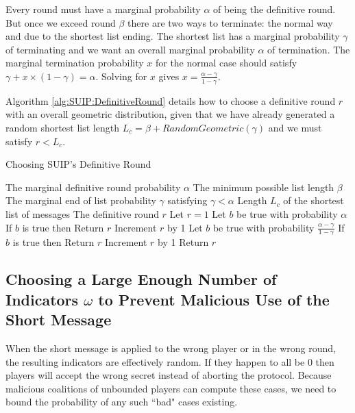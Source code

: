 \documentclass{dalcsthesis}
\begin{document}
Every round must have a marginal probability $\alpha$ of being the definitive round. But once we exceed round $\beta$ there are two ways to terminate: the normal way and due to the shortest list ending. The shortest list has a marginal probability $\gamma$ of terminating and we want an overall marginal probability $\alpha$ of termination. The marginal termination probability $x$ for the normal case should satisfy $\gamma + x \times (1 - \gamma) = \alpha$. Solving for $x$ gives $x = \frac{\alpha - \gamma}{1 - \gamma}$.

Algorithm \ref{alg:SUIP:DefinitiveRound} details how to choose a definitive round $r$ with an overall geometric distribution, given that we have already generated a random shortest list length $L_c = \beta + RandomGeometric(\gamma)$ and we must satisfy $r < L_c$.

\begin{algorithm}
  \caption{Choosing SUIP's Definitive Round}
  \label{alg:SUIP:DefinitiveRound}
  \begin{algorithmic}
    \INPUT The marginal definitive round probability $\alpha$ 
    \INPUT The minimum possible list length $\beta$
    \INPUT The marginal end of list probability $\gamma$ satisfying $\gamma < \alpha$
    \INPUT Length $L_c$ of the shortest list of messages
    \OUTPUT The definitive round $r$
    \STATE Let $r = 1$
      \STATE Let $b$ be true with probability $\alpha$
      \STATE If $b$ is true then Return $r$
      \STATE Increment $r$ by 1 
    \ENDWHILE
      \STATE Let $b$ be true with probability $\frac{\alpha - \gamma}{1 - \gamma}$
      \STATE If $b$ is true then Return $r$
      \STATE Increment $r$ by 1
    \ENDWHILE
    \STATE Return $r$
  \end{algorithmic}
\end{algorithm}

\subsection{Choosing a Large Enough Number of Indicators $\omega$ to Prevent Malicious Use of the Short Message}
\label{Sec:SUIP:MinIndicators}

When the short message is applied to the wrong player or in the wrong round, the resulting indicators are effectively random. If they happen to all be 0 then players will accept the wrong secret instead of aborting the protocol. Because malicious coalitions of unbounded players can compute these cases, we need to bound the probability of any such ``bad" cases existing.
\end{document}
